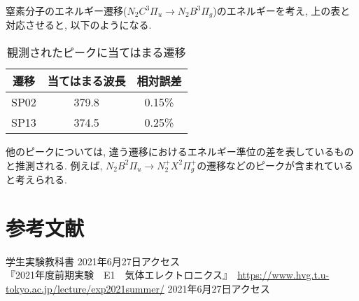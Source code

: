 \documentclass{ltjsarticle}
\begin{document}
窒素分子のエネルギー遷移($N_2C^3\Pi_u \rightarrow N_2B^3\Pi_g$)のエネルギーを考え, 上の表と対応させると, 以下のようになる. 

\begin{table}[H]
    \begin{center}
        \begin{tabular}{|c|c|c|} \hline
            遷移 & 当てはまる波長 & 相対誤差 \\ \hline
            SP02 & 379.8 & 0.15\% \\ \hline
            SP13 & 374.5 & 0.25\% \\ \hline
        \end{tabular}
        \caption{観測されたピークに当てはまる遷移}
    \end{center}
\end{table}

他のピークについては, 違う遷移におけるエネルギー準位の差を表しているものと推測される. 例えば, $N_2B^2 \Pi_u \rightarrow N_2^+X^2\Pi_g^+$の遷移などのピークが含まれていると考えられる. 



\section{参考文献}
学生実験教科書 2021年6月27日アクセス\\
『2021年度前期実験　E1　気体エレクトロニクス』　\url{https://www.hvg.t.u-tokyo.ac.jp/lecture/exp2021summer/} 2021年6月27日アクセス
\end{document}
